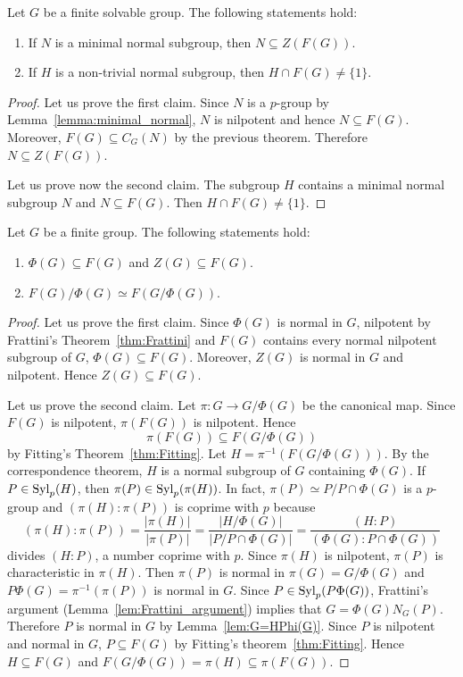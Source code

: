 \begin{corollary}
Let $G$ be a finite solvable group. The following statements hold: 
\begin{enumerate}
\item If $N$ is a minimal normal subgroup, then $N\subseteq Z(F(G))$. 
\item If $H$ is a non-trivial normal subgroup, then $H\cap F(G)\ne\{1\}$.
\end{enumerate}
\end{corollary}

\begin{proof}
Let us prove the first claim. Since $N$ is a $p$-group by Lemma~\ref{lemma:minimal_normal}, 
$N$ is nilpotent and hence $N\subseteq F(G)$. Moreover, $F(G)\subseteq C_G(N)$ by the previous theorem. 
Therefore $N\subseteq Z(F(G))$. 

Let us prove now the second claim. The subgroup $H$ contains a minimal normal subgroup $N$ and 
$N\subseteq F(G)$. Then $H\cap F(G)\ne\{1\}$. 
\end{proof}

\begin{theorem}
Let $G$ be a finite group. The following statements hold:
\begin{enumerate}
\item $\Phi(G)\subseteq F(G)$ and $Z(G)\subseteq F(G)$.
\item $F(G)/\Phi(G)\simeq F(G/\Phi(G))$.
\end{enumerate}
\end{theorem}

\begin{proof}
Let us prove the first claim. Since $\Phi(G)$ is normal in $G$, nilpotent by 
Frattini's Theorem~\ref{thm:Frattini} and $F(G)$ contains every normal nilpotent subgroup of $G$, 
$\Phi(G)\subseteq F(G)$. Moreover, $Z(G)$ is normal in $G$ and nilpotent. Hence 
$Z(G)\subseteq F(G)$.

Let us prove the second claim. Let $\pi\colon G\to G/\Phi(G)$ be the canonical map. Since 
$F(G)$ is nilpotent, $\pi(F(G))$ is nilpotent. Hence 
\[
\pi(F(G))\subseteq F(G/\Phi(G))
\]
by Fitting's Theorem~\ref{thm:Fitting}. Let 
$H=\pi^{-1}(F(G/\Phi(G)))$. By the correspondence theorem, $H$ is a normal 
subgroup of $G$ containing $\Phi(G)$. If $P\in\mathrm{Syl}_p(H)$, then 
$\pi(P)\in\mathrm{Syl}_p(\pi(H))$. In fact, $\pi(P)\simeq P/P\cap \Phi(G)$ is a $p$-group and 
$(\pi(H):\pi(P))$ is coprime with $p$ because 
	\[
	(\pi(H):\pi(P))
	=\frac{|\pi(H)|}{|\pi(P)|}
	=\frac{|H/\Phi(G)|}{|P/P\cap \Phi(G)|}
	=\frac{(H:P)}{(\Phi(G):P\cap\Phi(G))}
	\]
divides $(H:P)$, a number coprime with $p$. Since $\pi(H)$ is nilpotent, 
$\pi(P)$ is characteristic in $\pi(H)$. Then $\pi(P)$ is normal
in $\pi(G)=G/\Phi(G)$ and $P\Phi(G)=\pi^{-1}(\pi(P))$ is normal 
in $G$. Since $P\in\mathrm{Syl}_p(P\Phi(G))$, Frattini's argument (Lemma~\ref{lem:Frattini_argument}) implies that 
$G=\Phi(G)N_G(P)$. Therefore $P$
is normal in $G$ by Lemma~\ref{lem:G=HPhi(G)}. Since $P$ is nilpotent and normal in $G$, 
$P\subseteq F(G)$ by Fitting's theorem~\ref{thm:Fitting}. Hence 
$H\subseteq F(G)$ and 
$F(G/\Phi(G))=\pi(H)\subseteq \pi(F(G))$.
\end{proof}

